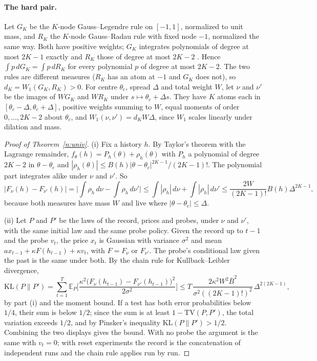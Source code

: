 \paragraph{The hard pair.} Let $G_K$ be the $K$-node Gauss--Legendre rule on $[-1,1]$, normalized to unit mass, and $R_K$ the $K$-node Gauss--Radau rule with fixed node $-1$, normalized the same way. Both have positive weights; $G_K$ integrates polynomials of degree at most $2K-1$ exactly and $R_K$ those of degree at most $2K-2$ \citep[Section~3.4]{szego1975}. Hence $\int p\,dG_K=\int p\,dR_K$ for every polynomial $p$ of degree at most $2K-2$. The two rules are different measures ($R_K$ has an atom at $-1$ and $G_K$ does not), so $d_K=W_1(G_K,R_K)>0$. For centre $\theta_c$, spread $\Delta$ and total weight $W$, let $\nu$ and $\nu'$ be the images of $WG_K$ and $WR_K$ under $s\mapsto\theta_c+\Delta s$. They have $K$ atoms each in $[\theta_c-\Delta,\theta_c+\Delta]$, positive weights summing to $W$, equal moments of order $0,\ldots,2K-2$ about $\theta_c$, and $W_1(\nu,\nu')=d_KW\Delta$, since $W_1$ scales linearly under dilation and mass.

\begin{proof}[Proof of Theorem~\ref{n:univ}]
(i) Fix a history $h$. By Taylor's theorem with the Lagrange remainder, $f_\theta(h)=P_h(\theta)+\rho_h(\theta)$ with $P_h$ a polynomial of degree $2K-2$ in $\theta-\theta_c$ and $|\rho_h(\theta)|\le B(h)|\theta-\theta_c|^{2K-1}/(2K-1)!$. The polynomial part integrates alike under $\nu$ and $\nu'$. So
\[
|F_\nu(h)-F_{\nu'}(h)|=\Big|\int\rho_h\,d\nu-\int\rho_h\,d\nu'\Big|\le\int|\rho_h|\,d\nu+\int|\rho_h|\,d\nu'\le\frac{2W}{(2K-1)!}B(h)\Delta^{2K-1},
\]
because both measures have mass $W$ and live where $|\theta-\theta_c|\le\Delta$.

(ii) Let $P$ and $P'$ be the laws of the record, prices and probes, under $\nu$ and $\nu'$, with the same initial law and the same probe policy. Given the record up to $t-1$ and the probe $v_t$, the price $x_t$ is Gaussian with variance $\sigma^2$ and mean $ax_{t-1}+\kappa F(h_{t-1})+\kappa v_t$, with $F=F_\nu$ or $F_{\nu'}$. The probe's conditional law given the past is the same under both. By the chain rule for Kullback--Leibler divergence,
\[
\mathrm{KL}(P\|P')=\sum_{t=1}^{T}\mathbb E_P\Big[\frac{\kappa^2\big(F_\nu(h_{t-1})-F_{\nu'}(h_{t-1})\big)^2}{2\sigma^2}\Big]\le T\,\frac{2\kappa^2W^2\bar B^2}{\sigma^2((2K-1)!)^2}\,\Delta^{2(2K-1)},
\]
by part (i) and the moment bound. If a test has both error probabilities below $1/4$, their sum is below $1/2$; since the sum is at least $1-\mathrm{TV}(P,P')$, the total variation exceeds $1/2$, and by Pinsker's inequality $\mathrm{KL}(P\|P')>1/2$. Combining the two displays gives the bound. With no probe the argument is the same with $v_t=0$; with reset experiments the record is the concatenation of independent runs and the chain rule applies run by run.
\end{proof}

